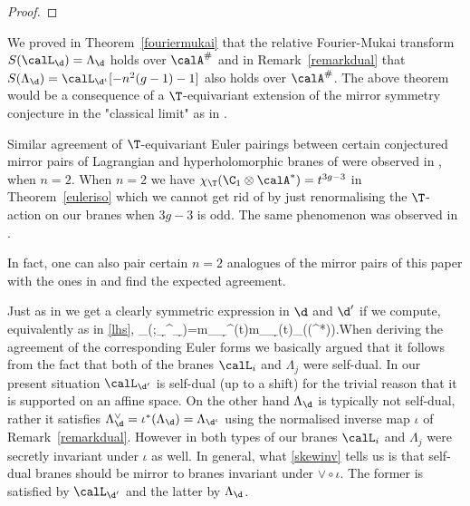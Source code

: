 \begin{proof}
\end{proof}

\begin{remark}
\notready We proved in Theorem~\ref{fouriermukai} that the relative Fourier-Mukai transform $S(\calL_{\d})=\Lambda_{\d}$ holds over $\calA^\#$ and in Remark~\ref{remarkdual} that  $S(\Lambda_{\d})=\calL_{\d^\iota}[-n^2(g-1)-1]$ also holds over $\calA^\#$. The above theorem  would be a consequence  of a $\T$-equivariant extension of  the mirror symmetry conjecture in the "classical limit"  as in \cite[Conjecture 2.5]{donagi-pantev}.
\end{remark}

\begin{remark}
\notready Similar agreement of $\T$-equivariant Euler pairings between certain conjectured mirror pairs of Lagrangian and hyperholomorphic branes of \cite{hitchin2} were observed
	in \cite[\S 7]{hausel-mellit-pei}, when $n=2$. When $n=2$ we have $\chi_\T(\C_1\otimes \calA^*)=t^{3g-3}$ in Theorem~\ref{euleriso} which we cannot get rid of by just renormalising the $\T$-action on our branes when $3g-3$ is odd. The same phenomenon was observed in \cite[Remark 7.7]{hausel-mellit-pei}.

	In fact, one can also pair certain $n=2$ analogues of the mirror pairs of this paper with the ones in \cite{hausel-mellit-pei} and find the expected agreement.

\end{remark}

\begin{remark}
\notready Just as in \cite[Corollary 4.11]{hausel-mellit-pei} we get a clearly symmetric expression in $\d$ and $\d^\prime$ if we compute, equivalently as in  \eqref{lhs},
	\beq	\label{tensorsym}\chi_\T(\M;\calL_{\d^\prime}\otimes \Lambda_{\d})=m_{\calE_{\d^\prime}}(t)m_{\calE_{\d}}(t)\chi_\T(\Sym(\calA^*)).\eeq When deriving the agreement of the corresponding Euler forms \cite[Corollary 7.1]{hausel-mellit-pei} we basically argued that it follows from the fact that both of the branes $\calL_i$ and $\Lambda_j$ were self-dual. In our present situation ${\calL_{\d^\prime}}$ is self-dual (up to a shift) for the trivial reason that it is supported on an affine space. On the other hand $\Lambda_{\d}$ is typically not self-dual, rather it satisfies $\Lambda^\vee_{\d}=\iota^*(\Lambda_{\d})=\Lambda_{\d^\iota}$ using the normalised inverse map $\iota$ of Remark~\ref{remarkdual}.  However in \cite{hausel-mellit-pei} both types of our branes $\calL_i$ and $\Lambda_j$ were secretly invariant under $\iota$ as well. In general, what \eqref{skewinv} tells us is that self-dual branes should be mirror to branes invariant under $\vee \circ \iota$. The former is satisfied by $\calL_{\d^\prime}$ and the latter by $\Lambda_{\d}$.
\end{remark}

